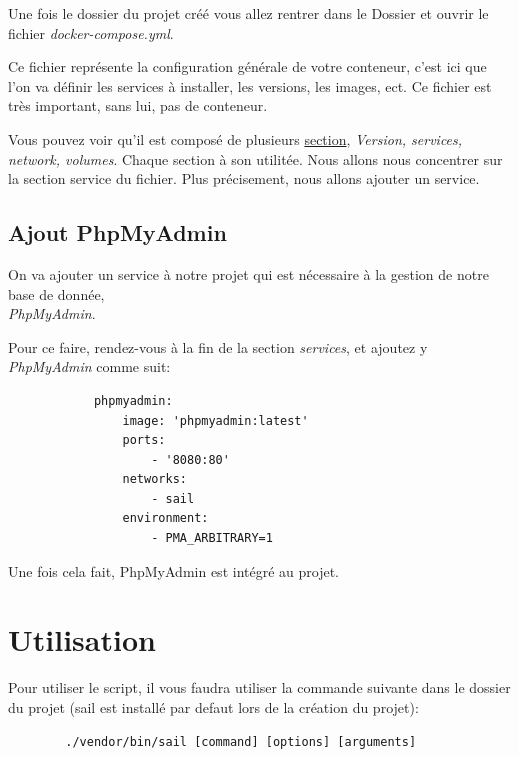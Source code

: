 \documentclass[internal]{nhitec_design}
\begin{document}
        Une fois le dossier du projet créé vous allez rentrer dans le Dossier et ouvrir le fichier \textit{docker-compose.yml}.

        Ce fichier représente la configuration générale de votre conteneur, c'est ici que l'on va définir les services à installer, les versions, les images, ect.
        Ce fichier est très important, sans lui, pas de conteneur.

        Vous pouvez voir qu'il est composé de plusieurs \href{https://docs.docker.com/compose/compose-file/}{section}, \textit{Version, services, network, volumes}. Chaque section à son utilitée. Nous allons nous concentrer sur la section service du fichier. Plus précisement, nous allons ajouter un service.\\ 


\newpage

    \subsection{Ajout PhpMyAdmin}

        On va ajouter un service à notre projet qui est nécessaire à la gestion de notre base de donnée,\\ \textit{PhpMyAdmin}.
        
        Pour ce faire, rendez-vous à la fin de la section \textit{services}, et ajoutez y \textit{PhpMyAdmin} comme suit:

        \begin{lstlisting}
            phpmyadmin:
                image: 'phpmyadmin:latest' 
                ports:
                    - '8080:80' 
                networks:
                    - sail 
                environment:
                    - PMA_ARBITRARY=1
        \end{lstlisting}

        Une fois cela fait, PhpMyAdmin est intégré au projet.

    \section{Utilisation}
    Pour utiliser le script, il vous faudra utiliser la commande suivante dans le dossier du projet (sail est installé par defaut lors de la création du projet):

    \begin{lstlisting}
        ./vendor/bin/sail [command] [options] [arguments]
    \end{lstlisting}
\end{document}
